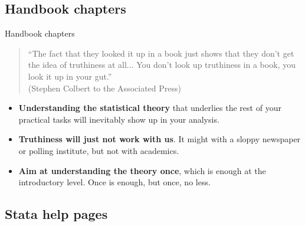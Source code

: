 \documentclass{beamer}
\begin{document}
	\subsection{Handbook chapters}

	\begin{frame}[t]{Handbook chapters}

		\begin{quote}
		``The fact that they looked it up in a book just shows that they don't get the idea of truthiness at all... You don't look up truthiness in a book, you look it up in your gut.''\\(Stephen Colbert to the Associated Press)
		\end{quote}\vspace{1em}
		
		\begin{itemize}
			\item \textbf{Understanding the statistical theory} that underlies the rest of your practical tasks will inevitably show up in your analysis.
			\item \textbf{Truthiness will just not work with us}. It might with a sloppy newspaper or polling institute, but not with academics.
			\item \textbf{Aim at understanding the theory once}, which is enough at the introductory level. Once is enough, but once, no less.
		\end{itemize}

	\end{frame}

	\subsection{Stata help pages}
\end{document}
